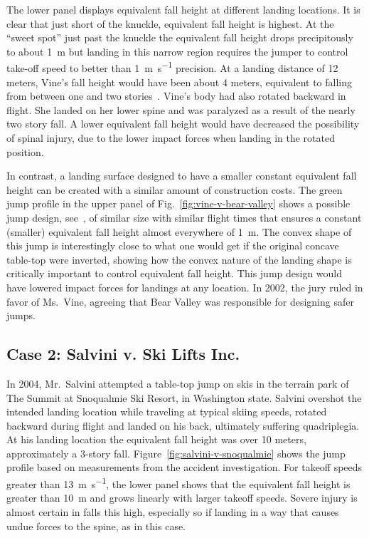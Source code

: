 \documentclass[smallextended]{svjour3}       %
\begin{document}
The lower panel displays equivalent fall height at different landing locations. It
is clear that just short of the knuckle, equivalent fall height is highest.
At the ``sweet spot'' just past the knuckle the equivalent fall height drops precipitously to  about
1~\si{\meter} but landing in this narrow region requires the jumper to control take-off
speed to better than 1~\si{\meter\per\second} precision. At a landing distance of 12 meters, Vine's fall height would have been
about 4 meters, equivalent to falling from between one and two
stories~\cite{Vish2005}. Vine's body had also rotated backward in flight. She
landed on her lower spine and was paralyzed as a result of the nearly two story
fall. A lower equivalent fall height would have decreased the possibility of
spinal injury, due to the lower impact forces when landing in the
rotated position.

In contrast, a landing surface designed to have a smaller constant equivalent fall
height can be created with a similar amount of construction costs. The green jump profile in the upper panel of
Fig.~\ref{fig:vine-v-bear-valley} shows a possible jump design,
see~\cite{Levy2015}, of similar size with similar flight times that ensures a
constant (smaller) equivalent fall height almost everywhere of 1~\si{\meter}.
The convex shape of this jump is interestingly close to what one would get if
the original concave table-top were inverted, showing how the convex nature of
the landing shape is critically important to control equivalent fall height.
This jump design would have lowered impact forces for landings at any location.
In 2002, the jury ruled in favor of Ms.~Vine, agreeing that Bear Valley was
responsible for designing safer jumps.

\subsection{Case 2: Salvini v. Ski Lifts Inc.}
\label{sec:salvini}
%
In 2004, Mr.~Salvini attempted a table-top jump on skis in the terrain park of
The Summit at Snoqualmie Ski Resort, in Washington state. Salvini overshot
the intended landing location while traveling at typical skiing speeds, rotated
backward during flight and landed on his back, ultimately suffering quadriplegia.
At his landing location the equivalent fall height was over 10 meters,
approximately a 3-story fall. Figure~\ref{fig:salvini-v-snoqualmie} shows the
jump profile based on measurements from the accident
investigation. For takeoff speeds greater than 13~\si{\meter\per\second}, the
lower panel shows that the equivalent fall height is greater
than 10~\si{\meter} and grows linearly with larger takeoff speeds. Severe
injury is almost certain in falls this high, especially so if landing in a
way that causes undue forces to the spine, as in this case.
\end{document}

